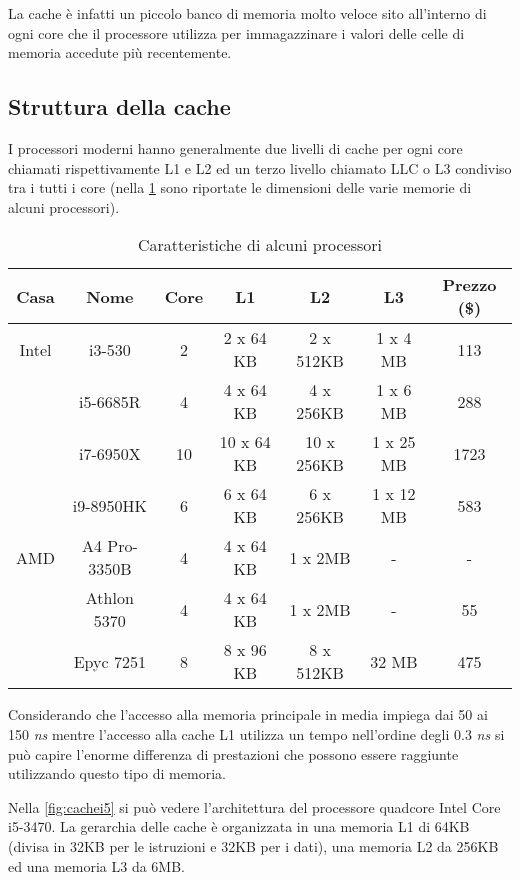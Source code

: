 		La cache è infatti un piccolo banco di memoria molto veloce sito all'interno di ogni core che il processore utilizza per immagazzinare i valori delle celle di memoria accedute più recentemente. 
		
		\subsection{Struttura della cache}
			I processori moderni hanno generalmente due livelli di cache per ogni core chiamati rispettivamente L1 e L2 ed un terzo livello chiamato \ac{LLC} o L3 condiviso tra i tutti i core (nella \cref{tab:processori} sono riportate le dimensioni delle varie memorie di alcuni processori). 
			
			\begin{table}[]
				\footnotesize
				\centering
				\begin{tabular}{|c|c|c|c|c|c|c|} \hline
					Casa		& Nome			& Core	& L1			& L2			& L3		& Prezzo (\$)	\\ \hline \hline
					Intel		& i3-530		& 2		& 2 x 64 KB		& 2 x 512KB		& 1 x 4 MB	& 113			\\ \hline
								& i5-6685R		& 4		& 4 x 64 KB		& 4 x 256KB		& 1 x 6 MB	& 288			\\ \hline
								& i7-6950X		& 10	& 10 x 64 KB	& 10 x 256KB	& 1 x 25 MB	& 1723			\\ \hline
								& i9-8950HK		& 6		& 6 x 64 KB		& 6 x 256KB		& 1 x 12 MB	& 583			\\ \hline
					AMD			& A4 Pro-3350B	& 4		& 4 x 64 KB		& 1 x 2MB		& -			& -				\\ \hline
								& Athlon 5370	& 4		& 4 x 64 KB		& 1 x 2MB		& -			& 55			\\ \hline
								& Epyc 7251		& 8		& 8 x 96 KB		& 8 x 512KB		& 32 MB		& 475			\\ \hline
				\end{tabular}
				\caption{Caratteristiche di alcuni processori}
				\label{tab:processori}
			\end{table}
			
			Considerando che l'accesso alla memoria principale in media impiega dai 50 ai 150 \emph{ns} mentre l'accesso alla cache L1 utilizza un tempo nell'ordine degli 0.3 \emph{ns} si può capire l'enorme differenza di prestazioni che possono essere raggiunte utilizzando questo tipo di memoria.
		
			Nella \cref{fig:cachei5} si può vedere l'architettura del processore quadcore Intel Core i5-3470. La gerarchia delle cache è organizzata in una memoria L1 di 64KB (divisa in 32KB per le istruzioni e 32KB per i dati), una memoria L2 da 256KB ed una memoria L3 da 6MB.
			
